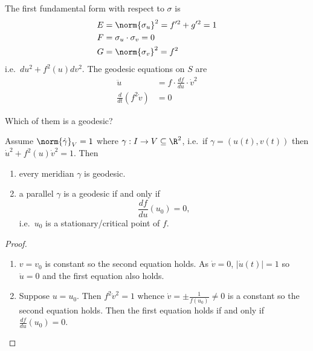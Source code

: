 \documentclass[a4paper]{article}
\theoremstyle{definition}
\begin{document}
The first fundamental form with respect to \(\sigma\) is
\begin{align*}
  E &= \norm{\sigma_u}^2 = f'^2 + g'^2 = 1 \\
  F &= \sigma_u \cdot \sigma_v = 0 \\
  G &= \norm{\sigma_v}^2 = f^2
\end{align*}
i.e.\ \(du^2 + f^2(u) dv^2\). The geodesic equations on \(S\) are
\begin{align*}
  \ddot u &= f \cdot \frac{df}{du} \cdot \dot v^2 \\
  \frac{d}{dt} (f^2 \dot v) &= 0
\end{align*}

Which of them is a geodesic?

\begin{proposition}
  Assume \(\norm{\dot \gamma}_V = 1\) where \(\gamma: I \to V \subseteq \R^2\), i.e.\ if \(\gamma = (u(t), v(t))\) then \(\dot u^2 + f^2(u)\dot v^2 = 1\). Then
  \begin{enumerate}
  \item every meridian \(\gamma\) is geodesic.
  \item a parallel \(\gamma\) is a geodesic if and only if
    \[
      \frac{df}{du}(u_0) = 0,
    \]
    i.e.\ \(u_0\) is a stationary/critical point of \(f\).
  \end{enumerate}
\end{proposition}

\begin{proof}\leavevmode
  \begin{enumerate}
  \item \(v = v_0 \) is constant so the second equation holds. As \(\dot v = 0\), \(|\dot u(t)| = 1\) so \(\ddot u = 0\) and the first equation also holds.
  \item Suppose \(u = u_0\). Then \(f^2 \dot v^2 = 1\) whence \(\dot v = \pm \frac{1}{f(u_0)} \neq 0\) is a constant so the second equation holds. Then the first equation holds if and only if \(\frac{df}{du} (u_0) = 0\).
  \end{enumerate}
\end{proof}









\printindex

\iffalse
Other courses that might be useful: topology, part of analysis II (differentiability in R^n and inverse function theorem)

Leads to: IID Differential Geometry

Reading List

P.\ Wilson, Curverd Spaces, CUP 2008
From classical geometries to elementary differential geometry
\fi
\end{document}
